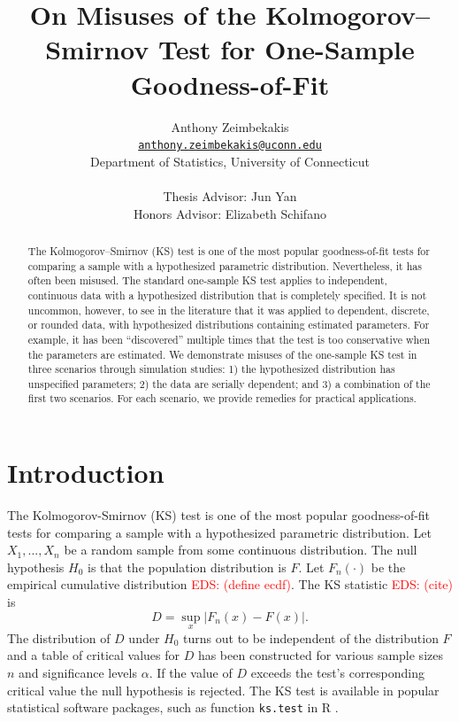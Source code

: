 \documentclass[12pt, letterpaper, titlepage]{article}
\title{On Misuses of the Kolmogorov--Smirnov Test for One-Sample Goodness-of-Fit}
\author{Anthony Zeimbekakis\\
\href{mailto:anthony.zeimbekakis@uconn.edu}
{\nolinkurl{anthony.zeimbekakis@uconn.edu}}\\
Department of Statistics, University of Connecticut\\\\
Thesis Advisor: Jun Yan\\
Honors Advisor: Elizabeth Schifano}
\date{}
\newcommand{\eds}[1]{\textcolor{red}{EDS: (#1)}}
\begin{document}
\maketitle

\doublespace

\begin{abstract}
The Kolmogorov--Smirnov (KS) test is one of the most popular goodness-of-fit tests 
for comparing a sample with a hypothesized parametric distribution. 
Nevertheless, it has often been misused. The standard one-sample KS test applies
to independent, continuous data with a hypothesized distribution that is 
completely specified. It is not uncommon, however, to see in the literature that
it was applied to dependent, discrete, or rounded data, with hypothesized 
distributions containing estimated parameters. For example, it has been 
``discovered'' multiple times that the test is too conservative when the 
parameters are estimated. We demonstrate misuses of the one-sample KS test in 
three scenarios through simulation studies:
1) the hypothesized distribution has unspecified parameters;
2) the data are serially dependent; and
3) a combination of the first two scenarios.
For each scenario, we provide remedies for practical applications.
\end{abstract}

\section{Introduction}
\label{sec:intro}

The Kolmogorov-Smirnov (KS) test is one of the most popular goodness-of-fit 
tests for comparing a sample with a hypothesized parametric distribution.
Let $X_1, ..., X_n$ be a random sample from some continuous distribution. 
The null hypothesis $H_0$ is that the population distribution is $F$.
Let $F_n(\cdot)$ be the empirical cumulative distribution \eds{define ecdf}. 
The KS statistic \eds{cite} is
\begin{equation}
  \label{eq:ks_standard}
  D = \sup_x | F_{n}(x) - F(x) |.
\end{equation}
The distribution of $D$ under $H_0$ turns out to be independent of the
distribution $F$ and a table of critical values for $D$ has been constructed
\citep{Massey} for various sample sizes $n$ and significance 
levels $\alpha$. If the value of $D$ exceeds the test's corresponding critical 
value the null hypothesis is rejected. The KS test is available in popular 
statistical software packages, such as function \texttt{ks.test} in R 
\citep{R, Marsaglia}.
\end{document}

